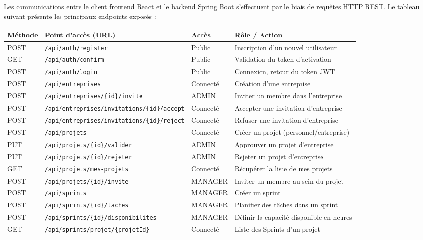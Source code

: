\documentclass[12pt,a4paper]{report}
\begin{document}
Les communications entre le client frontend React et le backend Spring Boot s'effectuent par le biais de requêtes HTTP REST. Le tableau suivant présente les principaux endpoints exposés :

\begin{longtable}{|p{1.5cm}|p{5.5cm}|p{2cm}|p{5cm}|}
\hline
\textbf{Méthode} & \textbf{Point d'accès (URL)} & \textbf{Accès} & \textbf{Rôle / Action} \\ \hline
POST & \verb|/api/auth/register| & Public & Inscription d'un nouvel utilisateur \\ \hline
GET & \verb|/api/auth/confirm| & Public & Validation du token d'activation \\ \hline
POST & \verb|/api/auth/login| & Public & Connexion, retour du token JWT \\ \hline
POST & \verb|/api/entreprises| & Connecté & Création d'une entreprise \\ \hline
POST & \verb|/api/entreprises/{id}/invite| & ADMIN & Inviter un membre dans l'entreprise \\ \hline
POST & \verb|/api/entreprises/invitations/{id}/accept| & Connecté & Accepter une invitation d'entreprise \\ \hline
POST & \verb|/api/entreprises/invitations/{id}/reject| & Connecté & Refuser une invitation d'entreprise \\ \hline
POST & \verb|/api/projets| & Connecté & Créer un projet (personnel/entreprise) \\ \hline
PUT & \verb|/api/projets/{id}/valider| & ADMIN & Approuver un projet d'entreprise \\ \hline
PUT & \verb|/api/projets/{id}/rejeter| & ADMIN & Rejeter un projet d'entreprise \\ \hline
GET & \verb|/api/projets/mes-projets| & Connecté & Récupérer la liste de mes projets \\ \hline
POST & \verb|/api/projets/{id}/invite| & MANAGER & Inviter un membre au sein du projet \\ \hline
POST & \verb|/api/sprints| & MANAGER & Créer un sprint \\ \hline
POST & \verb|/api/sprints/{id}/taches| & MANAGER & Planifier des tâches dans un sprint \\ \hline
POST & \verb|/api/sprints/{id}/disponibilites| & MANAGER & Définir la capacité disponible en heures \\ \hline
GET & \verb|/api/sprints/projet/{projetId}| & Connecté & Liste des Sprints d'un projet \\ \hline

\end{longtable}
\end{document}
